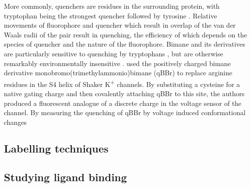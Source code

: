 More commonly, quenchers are residues in the surrounding protein, with tryptophan being the strongest quencher followed by tyrosine \cite{marme_inter-_2003, lakowicz_principles_2006}.
Relative movements of fluorophore and quencher which result in overlap of the van der Waals radii of the pair result in quenching, the efficiency of which depends on the species of quencher and the nature of the fluorophore.
Bimane and its derivatives are particularly sensitive to quenching by tryptophans \cite{mansoor_distance_2010}, but are otherwise remarkably environmentally insensitive \cite{mansoor_determination_1999}.
\citeauthor{priest_trajectory_2020} used the positively charged bimane derivative monobromo(trimethylammonio)bimane (qBBr) to replace arginine residues in the S4 helix of Shaker K\textsuperscript{+} channels.
By substituting a cysteine for a native gating charge and then covalently attaching qBBr to this site, the authors produced a fluorescent analogue of a discrete charge in the voltage sensor of the channel.
By measuring the quenching of qBBr by voltage induced conformational changes

\subsection{Labelling techniques}


\subsection{Studying ligand binding}